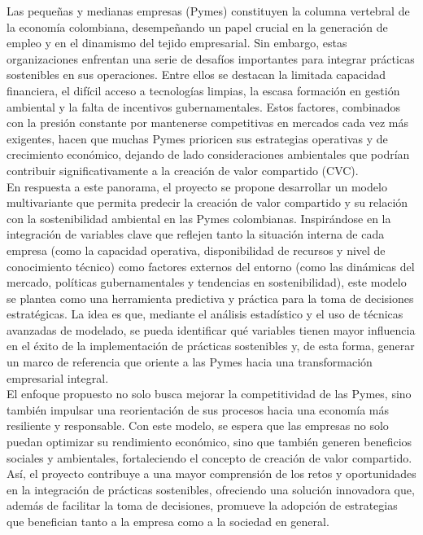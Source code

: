 Las pequeñas y medianas empresas (Pymes) constituyen la columna vertebral de la economía colombiana, desempeñando un papel crucial en la generación de empleo y en el dinamismo del tejido empresarial. Sin embargo, estas organizaciones enfrentan una serie de desafíos importantes para integrar prácticas sostenibles en sus operaciones. Entre ellos se destacan la limitada capacidad financiera, el difícil acceso a tecnologías limpias, la escasa formación en gestión ambiental y la falta de incentivos gubernamentales. Estos factores, combinados con la presión constante por mantenerse competitivas en mercados cada vez más exigentes, hacen que muchas Pymes prioricen sus estrategias operativas y de crecimiento económico, dejando de lado consideraciones ambientales que podrían contribuir significativamente a la creación de valor compartido (CVC).\\

En respuesta a este panorama, el proyecto se propone desarrollar un modelo multivariante que permita predecir la creación de valor compartido y su relación con la sostenibilidad ambiental en las Pymes colombianas. Inspirándose en la integración de variables clave que reflejen tanto la situación interna de cada empresa (como la capacidad operativa, disponibilidad de recursos y nivel de conocimiento técnico) como factores externos del entorno (como las dinámicas del mercado, políticas gubernamentales y tendencias en sostenibilidad), este modelo se plantea como una herramienta predictiva y práctica para la toma de decisiones estratégicas. La idea es que, mediante el análisis estadístico y el uso de técnicas avanzadas de modelado, se pueda identificar qué variables tienen mayor influencia en el éxito de la implementación de prácticas sostenibles y, de esta forma, generar un marco de referencia que oriente a las Pymes hacia una transformación empresarial integral.\\

El enfoque propuesto no solo busca mejorar la competitividad de las Pymes, sino también impulsar una reorientación de sus procesos hacia una economía más resiliente y responsable. Con este modelo, se espera que las empresas no solo puedan optimizar su rendimiento económico, sino que también generen beneficios sociales y ambientales, fortaleciendo el concepto de creación de valor compartido. Así, el proyecto contribuye a una mayor comprensión de los retos y oportunidades en la integración de prácticas sostenibles, ofreciendo una solución innovadora que, además de facilitar la toma de decisiones, promueve la adopción de estrategias que benefician tanto a la empresa como a la sociedad en general.\\

